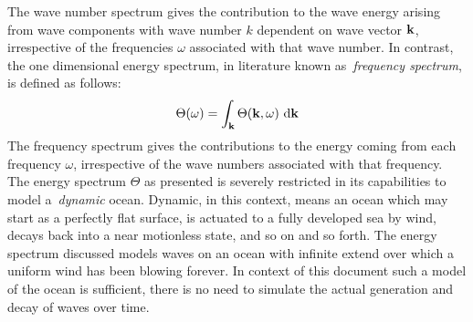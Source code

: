 The wave number spectrum gives the contribution to the wave energy arising from
wave components with wave number $k$ dependent on wave vector $\mathbf{k}$,
irrespective of the frequencies $\omega$ associated with that wave number. In
contrast, the one dimensional energy spectrum, in literature known
as~\emph{frequency spectrum}, is defined as follows:
\begin{equation}
\label{eq:energy_spectrum_1d}
 \Theta(\omega) = \int_{\mathbf{k}} \Theta(\mathbf{k}, \omega)~\mathrm{d}\mathbf{k}
\end{equation}
The frequency spectrum gives the contributions to the energy coming from each
frequency $\omega$, irrespective of the wave numbers associated with that
frequency.\\

The energy spectrum $\Theta$ as presented is severely restricted in its
capabilities to model a~\emph{dynamic} ocean. Dynamic, in this context, means an
ocean which may start as a perfectly flat surface, is actuated to a fully
developed sea by wind, decays back into a near motionless state, and so on and
so forth. The energy spectrum discussed models waves on an ocean with infinite
extend over which a uniform wind has been blowing forever. In context of this
document such a model of the ocean is sufficient, there is no need to simulate
the actual generation and decay of waves over time.

